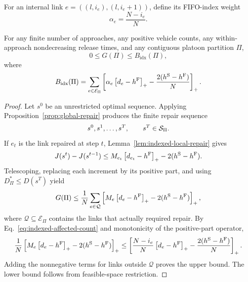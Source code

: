 For an internal link \(e=((l,i_e),(l,i_e+1))\), define its FIFO-index weight
\begin{equation}
\alpha_e=\frac{N-i_e}{N}.
\label{eq:index-weight}
\end{equation}

\begin{theorem}
\label{thm:indexed-loss-bound}
For any finite number of approaches, any positive vehicle counts, any
within-approach nondecreasing release times, and any contiguous platoon
partition \(\Pi\),
\begin{equation}
0\le G(\Pi)\le B_{\mathrm{idx}}(\Pi),
\label{eq:indexed-global-bound}
\end{equation}
where
\begin{equation}
B_{\mathrm{idx}}(\Pi)
=
\sum_{e\in\mathcal{E}_{\Pi}}
\left[
\alpha_e\left[d_e-h^{\mathrm{F}}\right]_{+}
-\frac{2(h^{\mathrm{S}}-h^{\mathrm{F}})}{N}
\right]_{+}.
\label{eq:indexed-partition-bound}
\end{equation}
\end{theorem}

\begin{proof}
Let \(s^0\) be an unrestricted optimal sequence. Applying
Proposition~\ref{prop:global-repair} produces the finite repair sequence
\begin{equation}
s^0,s^1,\ldots,s^T,
\qquad s^T\in\mathcal{S}_{\Pi}.
\end{equation}
If \(e_t\) is the link
repaired at step \(t\), Lemma~\ref{lem:indexed-local-repair} gives
\begin{equation}
J(s^t)-J(s^{t-1})
\le
M_{e_t}\left[d_{e_t}-h^{\mathrm{F}}\right]_{+}-2(h^{\mathrm{S}}-h^{\mathrm{F}}).
\end{equation}
Telescoping, replacing each increment by its positive part, and using
\(D^*_{\Pi}\le D(s^T)\) yield
\begin{equation}
G(\Pi)
\le
\frac{1}{N}
\sum_{e\in\mathcal Q}
\left[
M_e\left[d_e-h^{\mathrm{F}}\right]_{+}-2(h^{\mathrm{S}}-h^{\mathrm{F}})
\right]_{+},
\end{equation}
where \(\mathcal Q\subseteq\mathcal E_\Pi\) contains the links that actually
required repair. By Eq.~\eqref{eq:indexed-affected-count} and monotonicity of
the positive-part operator,
\begin{equation}
\frac{1}{N}
\left[
M_e\left[d_e-h^{\mathrm{F}}\right]_{+}-2(h^{\mathrm{S}}-h^{\mathrm{F}})
\right]_{+}
\le
\left[
\frac{N-i_e}{N}\left[d_e-h^{\mathrm{F}}\right]_{+}
-\frac{2(h^{\mathrm{S}}-h^{\mathrm{F}})}{N}
\right]_{+}.
\end{equation}
Adding the nonnegative terms for links outside \(\mathcal Q\) proves the
upper bound. The lower bound follows from feasible-space restriction.
\end{proof}

